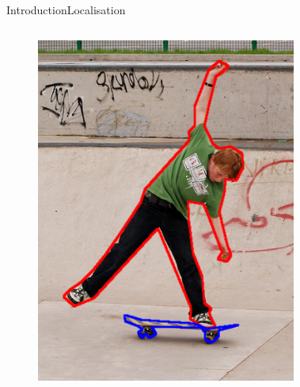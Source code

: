 \begin{frame}{Introduction}{Localisation}
\begin{columns}
\begin{figure}
                \includegraphics[width=1.0 \textwidth]{figs/objfieldsfiguresegmentation.png}
            \end{figure}
        \begin{figure}

\end{figure}
\end{columns}
\end{frame}
